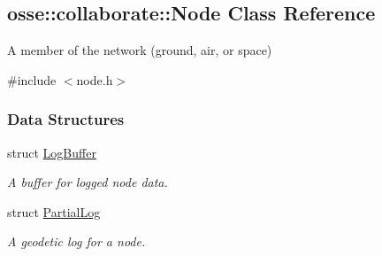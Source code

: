 \hypertarget{classosse_1_1collaborate_1_1_node}{}\subsection{osse\+:\+:collaborate\+:\+:Node Class Reference}
\label{classosse_1_1collaborate_1_1_node}


A member of the network (ground, air, or space)  




{\ttfamily \#include $<$node.\+h$>$}

\subsubsection*{Data Structures}
\begin{DoxyCompactItemize}
\item 
struct \hyperlink{structosse_1_1collaborate_1_1_node_1_1_log_buffer}{Log\+Buffer}
\begin{DoxyCompactList}\small\item\em A buffer for logged node data. \end{DoxyCompactList}\item 
struct \hyperlink{structosse_1_1collaborate_1_1_node_1_1_partial_log}{Partial\+Log}
\begin{DoxyCompactList}\small\item\em A geodetic log for a node. \end{DoxyCompactList}\end{DoxyCompactItemize}
